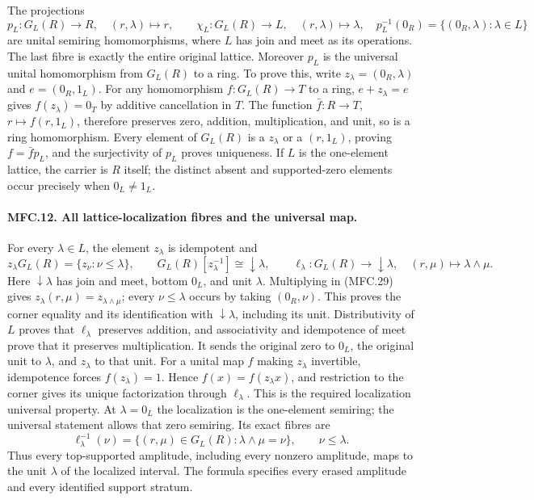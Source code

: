 The projections
\[
 p_L:G_L(R)\to R,\quad(r,\lambda)\mapsto r,\qquad
 \chi_L:G_L(R)\to L,\quad(r,\lambda)\mapsto\lambda,
 \quad p_L^{-1}(0_R)=\{(0_R,\lambda):\lambda\in L\}         \tag{MFC.30}
\]
are unital semiring homomorphisms, where \(L\) has join
and meet as its operations. The last fibre is exactly
the entire original lattice.
Moreover \(p_L\) is the universal unital homomorphism
from \(G_L(R)\) to a ring. To prove this, write
\(z_\lambda=(0_R,\lambda)\) and \(e=(0_R,1_L)\).
For any homomorphism \(f:G_L(R)\to T\) to a ring,
\(e+z_\lambda=e\) gives \(f(z_\lambda)=0_T\) by
additive cancellation in \(T\).
The function \(\bar f:R\to T\), \(r\mapsto f(r,1_L)\),
therefore preserves zero, addition, multiplication, and unit,
so is a ring homomorphism. Every element of \(G_L(R)\)
is a \(z_\lambda\) or a \((r,1_L)\), proving
\(f=\bar f p_L\), and the surjectivity of \(p_L\) proves
uniqueness. If \(L\) is the one-element lattice, the carrier
is \(R\) itself; the distinct absent and supported-zero
elements occur precisely when \(0_L\ne1_L\).

\paragraph{MFC.12. All lattice-localization fibres and the universal map.}
For every \(\lambda\in L\), the element \(z_\lambda\)
is idempotent and
\[
 z_\lambda G_L(R)=\{z_\nu:\nu\le\lambda\},\qquad
 G_L(R)[z_\lambda^{-1}]\cong\downarrow\lambda,\qquad
 \ell_\lambda:G_L(R)\to\downarrow\lambda,\quad
 (r,\mu)\mapsto\lambda\wedge\mu.                           \tag{MFC.31}
\]
Here \(\downarrow\lambda\) has join and meet, bottom \(0_L\),
and unit \(\lambda\). Multiplying in (MFC.29) gives
\(z_\lambda(r,\mu)=z_{\lambda\wedge\mu}\);
every \(\nu\le\lambda\) occurs by taking \((0_R,\nu)\).
This proves the corner equality and its identification
with \(\downarrow\lambda\), including its unit.
Distributivity of \(L\) proves that \(\ell_\lambda\)
preserves addition, and associativity and idempotence of
meet prove that it preserves multiplication. It sends
the original zero to \(0_L\), the original unit to
\(\lambda\), and \(z_\lambda\) to that unit.
For a unital map \(f\) making \(z_\lambda\) invertible,
idempotence forces \(f(z_\lambda)=1\). Hence
\(f(x)=f(z_\lambda x)\), and restriction to the corner
gives its unique factorization through \(\ell_\lambda\).
This is the required localization universal property.
At \(\lambda=0_L\) the localization is the one-element
semiring; the universal statement allows that zero semiring.
Its exact fibres are
\[
 \ell_\lambda^{-1}(\nu)
 =\{(r,\mu)\in G_L(R):\lambda\wedge\mu=\nu\},
 \qquad \nu\le\lambda.                                   \tag{MFC.32}
\]
Thus every top-supported amplitude, including every nonzero
amplitude, maps to the unit \(\lambda\) of the localized
interval. The formula specifies every erased amplitude
and every identified support stratum.

